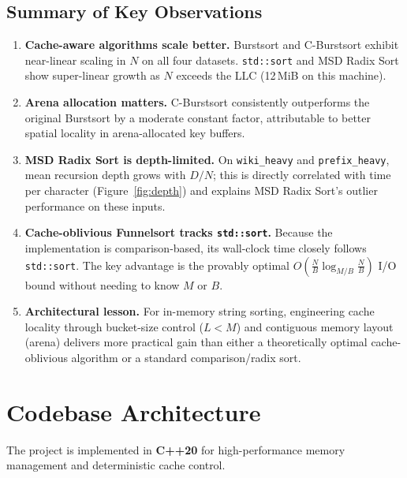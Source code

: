\documentclass{article}
\begin{document}
\subsection{Summary of Key Observations}

\begin{enumerate}
  \item \textbf{Cache-aware algorithms scale better.}
        Burstsort and C-Burstsort exhibit near-linear scaling in $N$ on all
        four datasets.  \texttt{std::sort} and MSD Radix Sort show super-linear
        growth as $N$ exceeds the LLC (12\,MiB on this machine).
  \item \textbf{Arena allocation matters.}
        C-Burstsort consistently outperforms the original Burstsort by a
        moderate constant factor, attributable to better spatial locality in
        arena-allocated key buffers.
  \item \textbf{MSD Radix Sort is depth-limited.}
        On \texttt{wiki\_heavy} and \texttt{prefix\_heavy}, mean recursion depth
        grows with $D/N$; this is directly correlated with time per character
        (Figure~\ref{fig:depth}) and explains MSD Radix Sort's outlier
        performance on these inputs.
  \item \textbf{Cache-oblivious Funnelsort tracks \texttt{std::sort}.}
        Because the implementation is comparison-based, its wall-clock time
        closely follows \texttt{std::sort}.  The key advantage is the provably
        optimal $O\!\left(\tfrac{N}{B}\log_{M/B}\tfrac{N}{B}\right)$ I/O
        bound without needing to know $M$ or $B$.
  \item \textbf{Architectural lesson.}
        For in-memory string sorting, engineering cache locality through
        bucket-size control ($L < M$) and contiguous memory layout (arena)
        delivers more practical gain than either a theoretically optimal
        cache-oblivious algorithm or a standard comparison/radix sort.
\end{enumerate}

\section{Codebase Architecture}

The project is implemented in \textbf{C++20} for high-performance memory
management and deterministic cache control.
\end{document}
